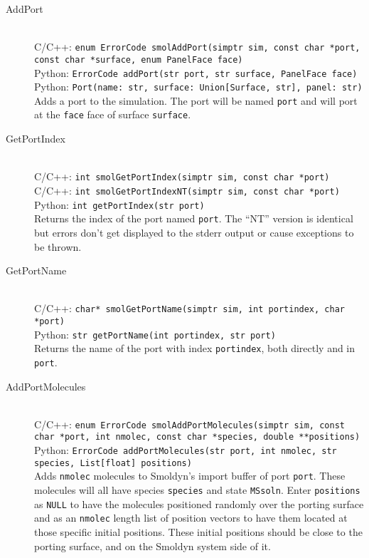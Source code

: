 \documentclass {scrbook}
\newcommand {\ttt} {\texttt}
\begin{document}
\begin{description}

\item[AddPort]
\hfill \\
C/C++: \ttt{enum ErrorCode smolAddPort(simptr sim, const char *port, const char *surface, enum PanelFace face)}\\
Python: \ttt{ErrorCode addPort(str port, str surface, PanelFace face)}\\
Python: \ttt{Port(name: str, surface: Union[Surface, str], panel: str)}\\
Adds a port to the simulation. The port will be named \ttt{port} and will port at the \ttt{face} face of surface \ttt{surface}.

\item[GetPortIndex]
\hfill \\
C/C++: \ttt{int smolGetPortIndex(simptr sim, const char *port)}\\
C/C++: \ttt{int smolGetPortIndexNT(simptr sim, const char *port)}\\
Python: \ttt{int getPortIndex(str port)}\\
Returns the index of the port named \ttt{port}. The ``NT'' version is identical but errors don't get displayed to the stderr output or cause exceptions to be thrown.

\item[GetPortName]
\hfill \\
C/C++: \ttt{char* smolGetPortName(simptr sim, int portindex, char *port)}\\
Python: \ttt{str getPortName(int portindex, str port)}\\
Returns the name of the port with index \ttt{portindex}, both directly and in \ttt{port}.

\item[AddPortMolecules]
\hfill \\
C/C++: \ttt{enum ErrorCode smolAddPortMolecules(simptr sim, const char *port, int nmolec, const char *species, double **positions)}\\
Python: \ttt{ErrorCode addPortMolecules(str port, int nmolec, str species, List[float] positions)}\\
Adds \ttt{nmolec} molecules to Smoldyn's import buffer of port \ttt{port}. These molecules will all have species \ttt{species} and state \ttt{MSsoln}. Enter \ttt{positions} as \ttt{NULL} to have the molecules positioned randomly over the porting surface and as an \ttt{nmolec} length list of position vectors to have them located at those specific initial positions. These initial positions should be close to the porting surface, and on the Smoldyn system side of it.


\end{description}
\end{document}
